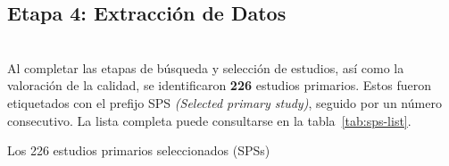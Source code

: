 \subsection{Etapa 4: Extracción de Datos}
\mbox{}\\
Al completar las etapas de búsqueda y selección de estudios, así como la valoración de la calidad, se identificaron \textbf{226} estudios primarios. Estos fueron etiquetados con el prefijo SPS \textit{(Selected primary study)}, seguido por un número consecutivo. La lista completa puede consultarse en la tabla~\ref{tab:sps-list}.

\begin{table*}[htbp]
\centering
\footnotesize
\caption{Los 226 estudios primarios seleccionados (SPSs)}\label{tab:sps-list}

\renewcommand{\arraystretch}{1.3} %


\end{table*}
